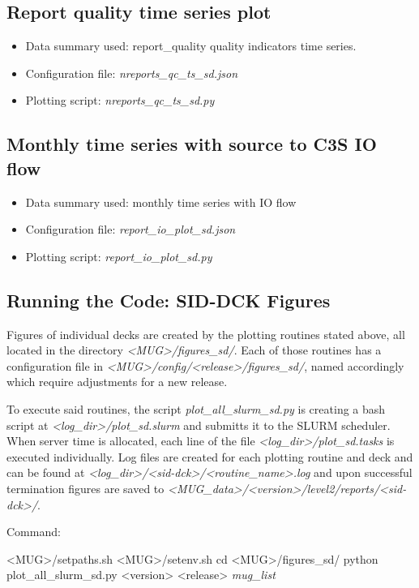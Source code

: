 \documentclass[letterpaper,10pt,english]{sphinxmanual}
\begin{document}
\subsection{Report quality time series plot}
\label{\detokenize{index:id7}}\begin{itemize}
\item {} 
Data summary used: report\_quality quality indicators time series.
\item {} 
Configuration file: \textit{nreports\_qc\_ts\_sd.json}
\item {} 
 Plotting script: \textit{nreports\_qc\_ts\_sd.py}
\end{itemize}


\subsection{Monthly time series with source to C3S IO flow}
\label{\detokenize{index:id8}}\begin{itemize}
\item {} 
Data summary used: monthly time series with IO flow
\item {} 
Configuration file: \textit{report\_io\_plot\_sd.json}
\item {} 
 Plotting script: \textit{report\_io\_plot\_sd.py}
\end{itemize}

\subsection{Running the Code: SID-DCK Figures}


Figures of individual decks are created by the plotting routines stated above, all located in the directory \textit{<MUG>/figures\_sd/}.
Each of those routines has a configuration file in \textit{<MUG>/config/<release>/figures\_sd/}, named accordingly which require adjustments for a new release.

To execute said routines, the script \textit{plot\_all\_slurm\_sd.py} is creating a bash script at \textit{<log\_dir>/plot\_sd.slurm}  and submitts it to the SLURM scheduler. 
When server time is allocated, each line of the file  \textit{<log\_dir>/plot\_sd.tasks} is executed individually. 
Log files are created for each plotting routine and deck and can be found at \textit{<log\_dir>/<sid-dck>/<routine\_name>.log} and upon successful termination figures are saved to \textit{<MUG\_data>/<version>/level2/reports/<sid-dck>/}.

Command:
\begin{sphinxVerbatim}[commandchars=\\\{\}]
 <MUG>/setpaths.sh
 <MUG>/setenv.sh
cd <MUG>/figures\_sd/
python plot\_all\_slurm\_sd.py <version> <release> \textit{mug\_list} 
\end{sphinxVerbatim}
\end{document}
